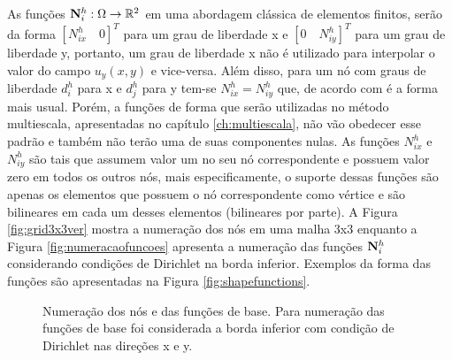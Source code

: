 As funções ${\mathbf{N}_{i}^h}: \Omega \rightarrow \mathbb{R}^2$ em uma abordagem clássica de elementos finitos, serão da forma $[N^h_{ix} \quad 0]^T$ para um grau de liberdade x e  $[0 \quad N^h_{iy}]^T$  para um grau de liberdade y, portanto, um grau de liberdade x não é utilizado para interpolar o valor do campo $u_y(x, y)$ e vice-versa. Além disso, para um nó com  graus de liberdade $d^h_i$ para x e $d^h_j$ para y tem-se $N^h_{ix} = N^h_{iy}$ que, de acordo com \cite{jacob} é a forma mais usual. Porém, a funções de forma que serão utilizadas no método multiescala, apresentadas no capítulo \ref{ch:multiescala}, não vão obedecer esse padrão e também não terão uma de suas componentes nulas. As funções $N^h_{ix}$ e $N^h_{iy}$ são tais que assumem valor um no seu nó correspondente e possuem valor zero em todos os outros nós, mais especificamente, o suporte dessas funções são apenas os elementos que possuem o nó correspondente como vértice e são bilineares em cada um desses elementos (bilineares por parte). A Figura \ref{fig:grid3x3ver} mostra a numeração dos nós em uma malha 3x3 enquanto a Figura \ref{fig:numeracaofuncoes} apresenta a numeração das funções ${\mathbf{N}_{i}^h}$ considerando condições de Dirichlet na borda inferior.
Exemplos da forma das funções são apresentadas na Figura \ref{fig:shapefunctions}. 


\begin{figure}[h]
\center
{}
\qquad
{}

\caption{Numeração dos nós e das funções de base. Para numeração das funções de base foi considerada a borda inferior com condição de Dirichlet nas direções x e y. }
\end{figure}


